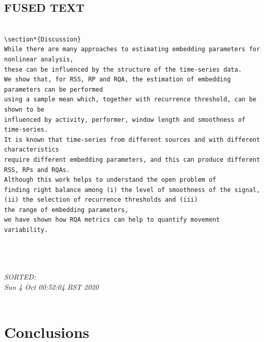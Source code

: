 \documentclass[10pt]{article}
\begin{document}
\subsection{FUSED TEXT}
\begin{verbatim}

\section*{Discussion}
While there are many approaches to estimating embedding parameters for nonlinear analysis, 
these can be influenced by the structure of the time-series data.   
We show that, for RSS, RP and RQA, the estimation of embedding parameters can be performed 
using a sample mean which, together with recurrence threshold, can be shown to be 
influenced by activity, performer, window length and smoothness of time-series.  
It is known that time-series from different sources and with different characteristics 
require different embedding parameters, and this can produce different RSS, RPs and RQAs. 
Although this work helps to understand the open problem of 
finding right balance among (i) the level of smoothness of the signal, 
(ii) the selection of recurrence thresholds and (iii) 
the range of embedding parameters, 
we have shown how RQA metrics can help to quantify movement variability.




\end{verbatim}



\textit{
SORTED: \\ 
Sun  4 Oct 00:52:04 BST 2020\\
}
\\





\section{Conclusions}
\end{document}
